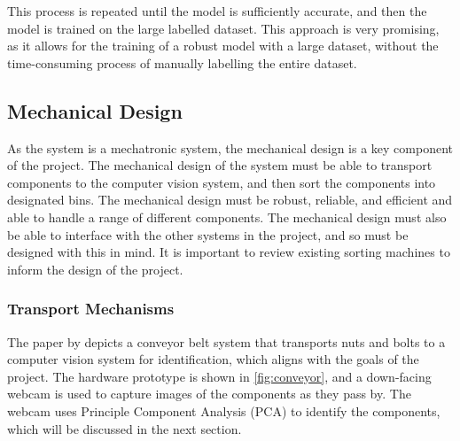 This process is repeated until the model is sufficiently accurate, and then the model is trained on the large labelled dataset. This approach is very promising, as it allows for the training of a robust model with a large dataset, without the time-consuming process of manually labelling the entire dataset.

\subsection{Mechanical Design}
As the system is a mechatronic system, the mechanical design is a key component of the project. The mechanical design of the system must be able to transport components to the computer vision system, and then sort the components into designated bins. The mechanical design must be robust, reliable, and efficient and able to handle a range of different components. The mechanical design must also be able to interface with the other systems in the project, and so must be designed with this in mind. It is important to review existing sorting machines to inform the design of the project.
\subsubsection{Transport Mechanisms}
The paper by \citet{Dhenge2013MechanicalNS} depicts a conveyor belt system that transports nuts and bolts to a computer vision system for identification, which aligns with the goals of the project. The hardware prototype is shown in \autoref{fig:conveyor}, and a down-facing webcam is used to capture images of the components as they pass by. The webcam uses Principle Component Analysis (PCA) to identify the components, which will be discussed in the next section.

